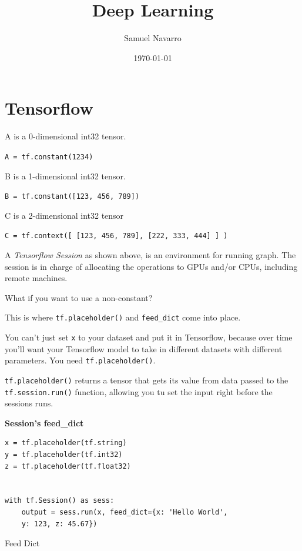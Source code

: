 \documentclass[11pt, a4paper]{article}
\begin{document}
\title{Deep Learning}
\author{Samuel Navarro}
\date{\today}
\maketitle

\tableofcontents


\section{Tensorflow}%
\label{sec:tensorflow}


A is a 0-dimensional int32 tensor.

\texttt{A = tf.constant(1234)}

B is a 1-dimensional int32 tensor. 

\texttt{B = tf.constant([123, 456, 789])}

C is a 2-dimensional int32 tensor

\texttt{C = tf.context([ [123, 456, 789], [222, 333, 444] ] ) }


A \textit{Tensorflow Session} as shown above, is an environment for running graph. The session is in charge of allocating the operations to GPUs and/or CPUs, including remote machines. 

What if you want to use a non-constant? 

This is where \texttt{tf.placeholder()} and \texttt{feed\_dict} come into place.

You can't just set \texttt{x} to your dataset and put it in Tensorflow, because over time you'll want your Tensorflow model to take in different datasets with different parameters. You need \texttt{tf.placeholder()}.

\texttt{tf.placeholder()} returns a tensor that gets its value from data passed to the \texttt{tf.session.run()} function, allowing you tu set the input right before the sessions runs. 

\textbf{Session's feed\_dict}

\begin{listing}
\begin{verbatim}
x = tf.placeholder(tf.string)
y = tf.placeholder(tf.int32)
z = tf.placeholder(tf.float32)


with tf.Session() as sess:
	output = sess.run(x, feed_dict={x: 'Hello World',
	y: 123, z: 45.67})
\end{verbatim}
\caption{Feed Dict}
\label{lst:feed_dict}
\end{listing}
\end{document}
